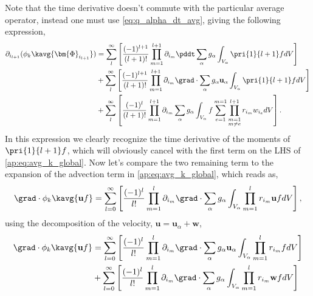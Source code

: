 Note that the time derivative doesn't commute with the particular average operator, instead one must use \ref{eq:q_alpha_dt_avg}, giving the following expression, 
\begin{align}
    \partial_{i_{l+1}}
    (\phi_k \kavg{\bm{\Phi}_{i_{l+1}}})
    & =\sum_l^\infty
    \left[
        \frac{(-1)^{l+1}}{(l+1)!}
        \prod^{l+1}_{m=1}
        \partial_{i_m}
        \pddt
        \sum_{\alpha}
        g_{\alpha} \int_{V_\alpha}
        \pri{1}{l+1}  f dV
    \right]
    \\
    & + \sum_l^\infty
    \left[
        \frac{(-1)^{l+1}}{(l+1)!}
        \prod^{l+1}_{m=1}
        \partial_{i_m}
        \grad \cdot
        \sum_{\alpha}
        g_{\alpha} \textbf{u}_\alpha 
        \int_{V_\alpha}
        \pri{1}{l+1}  f  dV
        \right]\\
        &+\sum_l^\infty
    \left[
        \frac{(-1)^{l}}{(l+1)!}
        \prod^{l+1}_{m=1}
        \partial_{i_m}
        \sum_{\alpha}
        g_{\alpha}\int_{V_\alpha}
        f\sum_{e=1}^{m=1} 
        \prod^{l+1}_{\substack{m=1\\ m\neq e}} 
        r_{i_m} 
        w_{i_e}
        dV
    \right].
    \label{ap:eq:partial_Phi}
\end{align}
In this expression we clearly recognize the time derivative of the moments of $\pri{1}{l+1}f$, which will obviously cancel with the first term on the LHS of \ref{ap:eq:avg_k_global}.
Now let's compare the two remaining term to the expansion of the advection term in \ref{ap:eq:avg_k_global}, which reads as, 
\begin{equation}
    \grad \cdot \phi_k \kavg{\textbf{u} f}
    = \sum_{l=0}^\infty  
    \left[
        \frac{(-1)^l}{l!} \prod^{l}_{m=1}\partial_{i_m}
        \grad \cdot
        \sum_\alpha  g_\alpha \int_{V_\alpha} \prod^l_{m=1}r_{i_m} \textbf{u} f dV
    \right],
\end{equation}
using the decomposition of the velocity, $\textbf{u} = \textbf{u}_\alpha + \textbf{w}$, 
\begin{align}
    \grad \cdot \phi_k \kavg{\textbf{u} f}
    &= \sum_{l=0}^\infty  
    \left[
        \frac{(-1)^l}{l!} \prod^{l}_{m=1}\partial_{i_m}
        \grad \cdot
        \sum_\alpha  g_\alpha \textbf{u}_\alpha  \int_{V_\alpha} \prod^l_{m=1}r_{i_m} f dV
    \right]\\
    &+ \sum_{l=0}^\infty  
    \left[
        \frac{(-1)^l}{l!} \prod^{l}_{m=1}\partial_{i_m}
        \grad \cdot
        \sum_\alpha  g_\alpha \int_{V_\alpha} \prod^l_{m=1}r_{i_m} \textbf{w} f dV
    \right]
    \label{ap:eq:partial_uf}
\end{align}
